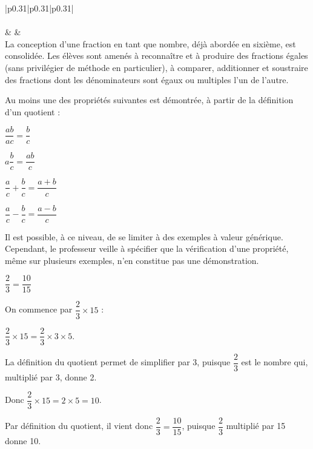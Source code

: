 {\tiny
\renewcommand{\arraystretch}{1.5}
\begin{tabular}{|p{0.31\linewidth}|p{0.31\linewidth}|p{0.31\linewidth}|}
\hline
{}\\\hline 
{}\\\hline 
{}
&
&
\\\hline
La conception d’une fraction en tant que nombre, déjà abordée
en sixième, est consolidée. Les élèves sont amenés à
reconnaître et à produire des fractions égales (sans privilégier de
méthode en particulier), à comparer, additionner et soustraire
des fractions dont les dénominateurs sont égaux ou multiples
l’un de l’autre.\par 
Au moins une des propriétés suivantes est démontrée, à partir
de la définition d’un quotient :
\begin{mylist}
\item $\dfrac{ab}{ac}=\dfrac{b}{c}$
\item $a\dfrac{b}{c}=\dfrac{ab}{c}$
\item $\dfrac{a}{c}+\dfrac{b}{c}=\dfrac{a+b}{c}$
\item $\dfrac{a}{c}-\dfrac{b}{c}=\dfrac{a-b}{c}$
\end{mylist}
Il est possible, à ce niveau, de se limiter à des exemples à valeur
générique. Cependant, le professeur veille à spécifier que la
vérification d’une propriété, même sur plusieurs exemples, n’en
constitue pas une démonstration.\par 
$\dfrac{2}{3}=\dfrac{10}{15}$\par
On commence par $\dfrac{2}{3}\times 15$ :\par 
$\dfrac{2}{3}\times 15=\dfrac{2}{3}\times 3\times 5$.\par 
La définition du quotient permet de simplifier par 3, puisque $\dfrac{2}{3}$
est le nombre qui, multiplié par 3, donne 2.\par
Donc $\dfrac{2}{3}\times 15=2\times 5=10$.\par 
Par définition du quotient, il vient donc $\dfrac{2}{3}=\dfrac{10}{15}$, puisque
$\dfrac{2}{3}$ multiplié par 15 donne 10.\par\vspace{0.5cm}

\end{tabular}}
